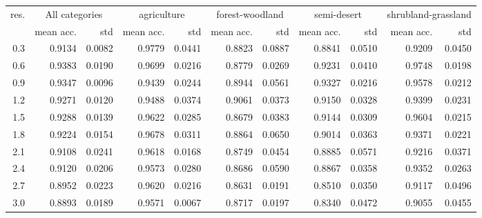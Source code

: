     
\begin{tabular}{rrrrrrrrrrr}
\toprule
res. & \multicolumn{2}{c}{All categories} & \multicolumn{2}{c}{agriculture} & \multicolumn{2}{c}{forest-woodland} & \multicolumn{2}{c}{semi-desert} & \multicolumn{2}{c}{shrubland-grassland} \\
           &     mean acc. &    std &                 mean acc. &    std &                     mean acc. &    std &                 mean acc. &    std &                         mean acc. &    std \\
\midrule
       0.3 &   0.9134 & 0.0082 &               0.9779 & 0.0441 &                   0.8823 & 0.0887 &               0.8841 & 0.0510 &                       0.9209 & 0.0450 \\
       0.6 &   0.9383 & 0.0190 &               0.9699 & 0.0216 &                   0.8779 & 0.0269 &               0.9231 & 0.0410 &                       0.9748 & 0.0198 \\
       0.9 &   0.9347 & 0.0096 &               0.9439 & 0.0244 &                   0.8944 & 0.0561 &               0.9327 & 0.0216 &                       0.9578 & 0.0212 \\
       1.2 &   0.9271 & 0.0120 &               0.9488 & 0.0374 &                   0.9061 & 0.0373 &               0.9150 & 0.0328 &                       0.9399 & 0.0231 \\
       1.5 &   0.9288 & 0.0139 &               0.9622 & 0.0285 &                   0.8679 & 0.0383 &               0.9144 & 0.0309 &                       0.9604 & 0.0215 \\
       1.8 &   0.9224 & 0.0154 &               0.9678 & 0.0311 &                   0.8864 & 0.0650 &               0.9014 & 0.0363 &                       0.9371 & 0.0221 \\
       2.1 &   0.9108 & 0.0241 &               0.9618 & 0.0168 &                   0.8749 & 0.0454 &               0.8885 & 0.0571 &                       0.9216 & 0.0371 \\
       2.4 &   0.9120 & 0.0206 &               0.9573 & 0.0280 &                   0.8686 & 0.0590 &               0.8867 & 0.0358 &                       0.9352 & 0.0263 \\
       2.7 &   0.8952 & 0.0223 &               0.9620 & 0.0216 &                   0.8631 & 0.0191 &               0.8510 & 0.0350 &                       0.9117 & 0.0496 \\
       3.0 &   0.8893 & 0.0189 &               0.9571 & 0.0067 &                   0.8717 & 0.0197 &               0.8340 & 0.0472 &                       0.9055 & 0.0455 \\

\end{tabular}
